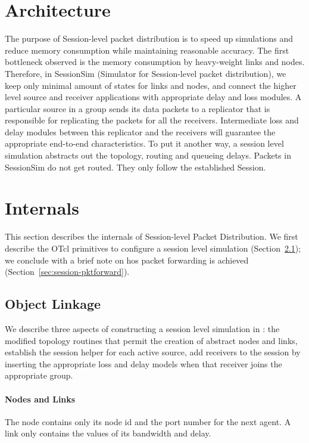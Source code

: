 \section{Architecture}
\label{sec:session-arch}
The purpose of Session-level packet distribution is to
speed up simulations and reduce memory consumption while 
maintaining reasonable accuracy.
The first bottleneck observed is the memory consumption by heavy-weight
links and nodes.  Therefore, in SessionSim (Simulator for Session-level
packet distribution), we keep only minimal amount of 
states for links and nodes, and connect the higher level source and 
receiver applications with appropriate delay and loss modules.
A particular source in a group sends its data packets
to a replicator that is responsible for replicating the packets
for all the receivers.
Intermediate loss and delay modules between this replicator and the receivers
will guarantee the appropriate end-to-end characteristics.
To put it another way, a session level simulation
abstracts out the topology, routing and queueing delays.
Packets in SessionSim do not get routed.  
They only follow the established Session.

\section{Internals}
This section describes the internals of Session-level Packet Distribution.
We first describe the OTcl primitives to configure a session level
simulation (Section~\ref{sec:session-objlink});
we conclude with a brief note on hos packet forwarding is achieved
(Section~\ref{sec:session-pktforward}).

\subsection{Object Linkage}
\label{sec:session-objlink}

We describe three aspects of constructing a session level simulation in
\ns:
the modified topology routines that permit the creation of abstract
nodes and links,
establish the session helper for each active source,
add receivers to the session by inserting the appropriate loss and delay
models when that receiver joins the appropriate group.

\paragraph{Nodes and Links}
The node contains only its node id and the port number for the next agent.
A link only contains the values of its bandwidth and delay.

